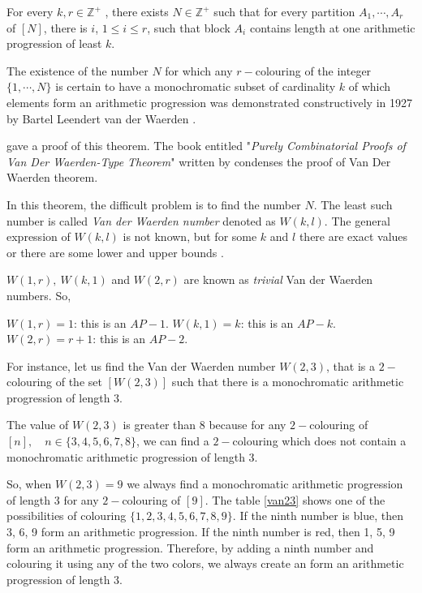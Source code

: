 \begin{thm}
For every $k, r \in \mathbb{Z}^+$ , there exists $N \in \mathbb{Z}^+$ such that for every partition $A_1, \cdots , A_r$ of $[N]$, there is $i$, $1 \leq i \leq r$, such that block $A_i$ contains length at one arithmetic progression of  least $k$.   \label{vd2}
\end{thm}

The existence of the number $N$ for which any $r-$colouring of the integer $\{1, \cdots, N\}$ is certain to have a monochromatic subset of cardinality $k$ of which elements form an arithmetic progression was demonstrated constructively in 1927 by Bartel Leendert van der Waerden \cite{van1927beweis}.

\cite{graham1974short} gave a proof of this theorem. The book entitled "\textit{Purely Combinatorial Proofs of Van Der Waerden-Type Theorem}" written by \cite{gasarch2010purely} condenses  the proof of Van Der Waerden theorem. 

In this theorem, the difficult problem is to find the number $N$. The least such number is called \textit{Van der Waerden number} denoted as $W(k,l).$ The general expression of $W(k,l)$ is not known, but for some $k$ and $l$ there are exact values or there are some lower and upper bounds \citep{dransfield2004}.

$W(1,r), \ W(k,1)$ and $W(2,r)$ are known as \textit{trivial} Van der Waerden numbers. So, 

 $W(1,r)=1$: this is an $AP-1$.  $W(k,1)=k$: this is an $AP-k$. $W(2,r)=r+1$: this is an $AP-2.$ 
 

For instance, let us find the Van der Waerden number $W(2,3)$, that is a $2-$colouring  of the set $[W(2,3)]$ such that there is a monochromatic arithmetic progression of length $3.$

The value of $W(2,3)$ is greater than $8$ because for any $2-$colouring of $[n],\quad n\in \{3,4,5,6,7,8\}$, we can find a $2-$colouring which does not contain a monochromatic arithmetic progression of length 3.

So, when $W(2,3)=9$ we always find a monochromatic arithmetic progression of length 3 for any $2-$colouring of $[9].$ The table \eqref{van23} shows one of the possibilities of colouring $\{1,2,3,4,5,6,7,8,9\}.$  If the ninth number is {\color{blue} blue}, then{ \color{blue}3, 6, 9}  form an arithmetic progression. If the ninth number is {\color{red} red}, then {\color{red}1, 5, 9} form an arithmetic progression. Therefore, by adding a ninth number and colouring it using any of the two colors, we always create an form an arithmetic progression of length 3.

